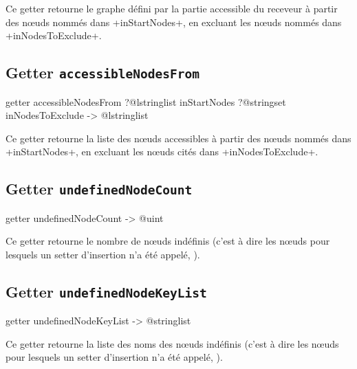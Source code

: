Ce getter retourne le graphe défini par la partie accessible du receveur à partir des nœuds nommés dans \ggs+inStartNodes+, en excluant les nœuds nommés dans \ggs+inNodesToExclude+.






\subsection{Getter \texttt{accessibleNodesFrom}}

\begin{galgas}
getter accessibleNodesFrom
  ?@lstringlist inStartNodes
  ?@stringset inNodesToExclude
  -> @lstringlist 
\end{galgas}

Ce getter retourne la liste des nœuds accessibles à partir des nœuds nommés dans \ggs+inStartNodes+, en excluant les nœuds cités dans \ggs+inNodesToExclude+.






\subsection{Getter \texttt{undefinedNodeCount}}

\begin{galgas}
getter undefinedNodeCount -> @uint 
\end{galgas}

Ce getter retourne le nombre de nœuds indéfinis (c'est à dire les nœuds pour lesquels un setter d'insertion n'a été appelé, ).







\subsection{Getter \texttt{undefinedNodeKeyList}}

\begin{galgas}
getter undefinedNodeKeyList -> @stringlist 
\end{galgas}

Ce getter retourne la liste des noms des nœuds indéfinis (c'est à dire les nœuds pour lesquels un setter d'insertion n'a été appelé, ).









